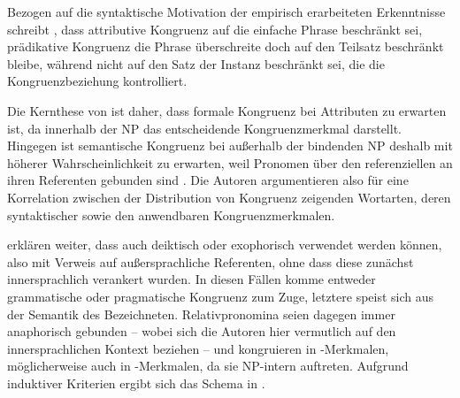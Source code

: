 Bezogen auf die syntaktische Motivation der empirisch erarbeiteten Erkenntnisse
schreibt \citet[216]{corbett1979}, dass attributive Kongruenz auf
die einfache Phrase beschränkt sei, prädikative
Kongruenz die Phrase überschreite doch auf den
Teilsatz beschränkt bleibe, während  nicht auf den Satz
der Instanz beschränkt sei, die die Kongruenzbeziehung
kontrolliert.

Die Kernthese von \citet{wechslerzlatic2003} ist daher, dass formale Kongruenz
bei Attributen zu erwarten ist, da innerhalb der
NP  das entscheidende
Kongruenzmerkmal darstellt. Hingegen ist semantische
Kongruenz bei  außerhalb der bindenden NP deshalb mit
höherer Wahrscheinlichkeit zu erwarten, weil Pronomen über den referenziellen
 an ihren Referenten gebunden sind
\autocite[89--91]{wechslerzlatic2003}. Die Autoren argumentieren also für eine
Korrelation zwischen der Distribution von
Kongruenz zeigenden Wortarten, deren syntaktischer  sowie den
anwendbaren Kongruenz\-merkmalen.

\citet[89]{wechslerzlatic2003} erklären weiter, dass 
auch deiktisch oder exophorisch verwendet werden können, also mit Verweis auf
außersprachliche Referenten, ohne dass diese zunächst innersprachlich
verankert wurden. In diesen Fällen komme entweder grammatische
oder pragmatische Kongruenz zum Zuge, letztere speist sich aus der Semantik des
Bezeichneten. Relativpronomina seien dagegen immer anaphorisch
gebunden -- wobei sich die Autoren hier vermutlich auf den innersprachlichen
Kontext beziehen -- und kongruieren in -Merkmalen, möglicherweise
auch in -Merkmalen, da sie NP-intern
auftreten. Aufgrund induktiver Kriterien ergibt sich
das Schema in .


